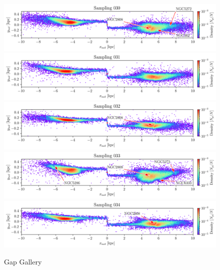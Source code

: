 \documentclass[draft]{aa}
\begin{document}
\begin{appendix}
    \begin{figure}
      \centering
      \includegraphics[width=\linewidth]{gallery_of_gaps_monte-carlo-030.png}
      \includegraphics[width=\linewidth]{gallery_of_gaps_monte-carlo-031.png}
      \includegraphics[width=\linewidth]{gallery_of_gaps_monte-carlo-032.png}
      \includegraphics[width=\linewidth]{gallery_of_gaps_monte-carlo-033.png}
      \includegraphics[width=\linewidth]{gallery_of_gaps_monte-carlo-034.png}
      \caption{Gap Gallery}
      \label{fig:TailCoordinates}
    \end{figure}        


\end{appendix}
\end{document}
